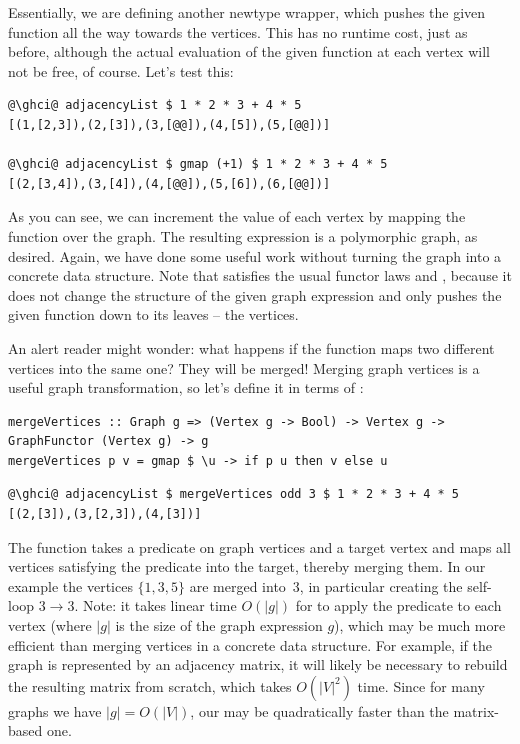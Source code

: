 Essentially, we are defining another newtype wrapper, which pushes the
given function all the way towards the vertices. This has no runtime cost,
just as before, although the actual evaluation of the given function at each
vertex will not be free, of course. Let's test this:

\begin{verbatim}
@\ghci@ adjacencyList $ 1 * 2 * 3 + 4 * 5
[(1,[2,3]),(2,[3]),(3,[@@]),(4,[5]),(5,[@@])]

@\ghci@ adjacencyList $ gmap (+1) $ 1 * 2 * 3 + 4 * 5
[(2,[3,4]),(3,[4]),(4,[@@]),(5,[6]),(6,[@@])]
\end{verbatim}
\vspace{-1mm}
As you can see, we can increment the value of each vertex by mapping the function
 over the graph. The resulting expression is a polymorphic graph, as desired.
Again, we have done some useful work without turning the graph into a concrete data
structure. Note that  satisfies the usual functor laws
 and , because
it does not change the structure of the given graph expression and only pushes
the given function down to its leaves -- the vertices.

An alert reader might wonder: what happens if the function maps two different
vertices into the same one? They will be merged! Merging graph vertices is
a useful graph transformation, so let's define it in terms of :

\begin{verbatim}
mergeVertices :: Graph g => (Vertex g -> Bool) -> Vertex g -> GraphFunctor (Vertex g) -> g
mergeVertices p v = gmap $ \u -> if p u then v else u
\end{verbatim}
\vspace{-1mm}
\begin{verbatim}
@\ghci@ adjacencyList $ mergeVertices odd 3 $ 1 * 2 * 3 + 4 * 5
[(2,[3]),(3,[2,3]),(4,[3])]
\end{verbatim}
\vspace{-1mm}
The function takes a predicate on graph vertices and a target vertex and
maps all vertices satisfying the predicate into the target, thereby
merging them. In our example the  vertices $\{1, 3, 5\}$ are merged
into~3, in particular creating the self-loop $3 \rightarrow 3$. Note: it takes
linear time $O(|g|)$ for  to apply the predicate to each vertex
(where $|g|$ is the size of the graph expression $g$), which may be much more efficient
than merging vertices in a concrete data structure. For example, if the graph
is represented by an adjacency matrix, it will likely be necessary to rebuild
the resulting matrix from scratch, which takes $O(|V|^2)$ time. Since for
many graphs we have $|g| = O(|V|)$, our 
may be quadratically faster than the matrix-based one.

